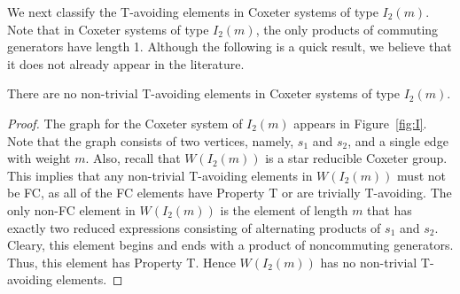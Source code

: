 We next classify the T-avoiding elements in Coxeter systems of type $I_2(m)$. Note that in Coxeter systems of type $I_2(m)$, the only products of commuting generators have length 1. Although the following is a quick result, we believe that it does not already appear in the literature.
\begin{theorem}
There are no non-trivial T-avoiding elements in Coxeter systems of type $I_2(m)$.
\begin{proof}
	The graph for the Coxeter system of $I_2(m)$ appears in Figure~\ref{fig:I}. Note that the graph consists of two vertices, namely, $s_1$ and $s_2$, and a single edge with weight $m$. Also, recall that $W(I_2(m))$ is a star reducible Coxeter group. This implies that any non-trivial T-avoiding elements in $W(I_2(m))$ must not be FC, as all of the FC elements have Property T or are trivially T-avoiding. The only non-FC element in $W(I_2(m))$ is the element of length $m$ that has exactly two reduced expressions consisting of alternating products of $s_1$ and $s_2$. Cleary, this element begins and ends with a product of noncommuting generators. Thus, this element has Property T. Hence $W(I_2(m))$ has no non-trivial T-avoiding elements. 
\end{proof}	
\end{theorem}
 



